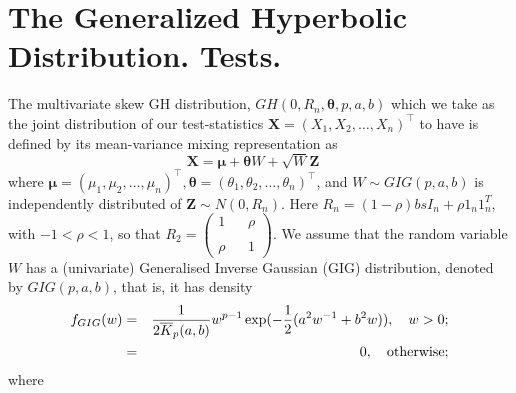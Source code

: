 \documentclass[12pt,fleqn] {article}
\newcommand{\bs}{\boldsymbol}
\begin{document}



\section{The Generalized Hyperbolic Distribution. Tests.}
The  multivariate skew GH distribution, $GH(0,R_n,\bs{\theta}, p,a,b)$ which we take as the joint distribution of our test-statistics $\textbf{X} = (X_1, X_2, \ldots ,X_n)^{\top}$ to have  is defined by its mean-variance mixing representation as 
\begin{equation}
\textbf{X} = \bs{\mu}+ \bs{\theta} W + \sqrt{W}\textbf{Z}   \quad \label{define: skew GH}
\end{equation}
where $\bs{\mu} = (\mu_1, \mu_2, \ldots ,\mu_n)^{\top}, \bs{\theta} = (\theta_1,\theta_2, \ldots, \theta_n)^{\top}$, and $ W \sim GIG(p,a,b)$ is independently distributed of $\textbf{Z} \sim N(0, R_n)$. Here $R_n =(1-\rho) bs{I_n} + \rho 1_n 1_n^{T}$,  with $-1<\rho<1$,  so that  $R_2 = \left( \begin{smallmatrix} 1 & & \rho \\ \\ \rho & & 1\end{smallmatrix}\right)$. We assume that the  random variable $W$ has a (univariate) Generalised Inverse
Gaussian (GIG) distribution, denoted by $GIG(p,a,b)$, that is, it has density
\begin{eqnarray*}
f_{GIG}(w) &=& \frac{1}{2\overline{K}_{p}(a,b)}w^{p-1}\exp(-\frac{1}{2}(a^2w^{-1}+b^2w)), \quad  w>0; \label{density:GIG}
\\
\notag &=& 0, \quad \text{otherwise;} \end{eqnarray*}
where
\end{document}
